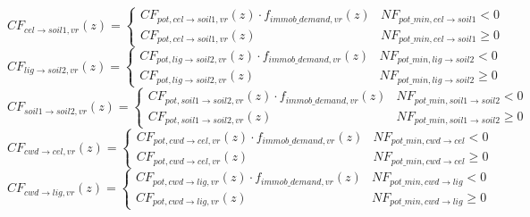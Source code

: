 \begin{equation}
CF_{cel \rightarrow { soil1,vr }}(z)=\left\{\begin{array}{ll}CF_{pot, cel \rightarrow { soil1,vr }}(z) \cdot f_{immob\_{demand, vr}}(z) & NF_{pot\_{min, cel \rightarrow {soil1}}}<0 \\ 
CF_{pot, cel \rightarrow { soil1,vr }}(z) & NF_{pot\_{min,cel } \rightarrow { soil1 }} \geqslant 0
\end{array}\right.
\end{equation}
\begin{equation}
CF_{{lig } \rightarrow { soil2,vr }}(z)=\left\{\begin{array}{ll}C F_{pot, lig \rightarrow { soil2,vr }}(z) \cdot f_{immob\_{demand, vr}}(z) & NF_{pot\_{min, lig \rightarrow { soil2 }}} <0 \\ 
CF_{pot, lig \rightarrow { soil2,vr }}(z) &  NF_{pot\_{min, lig \rightarrow { soil2}}} \geqslant 0
  \end{array}\right.
\end{equation}
\begin{equation}
    C F_{{soil1 } \rightarrow { soil2,vr }}(z)=\left\{\begin{array}{ll}C F_{pot, soil1 \rightarrow { soil2,vr }}(z) \cdot f_{immob\_demand, vr}(z) & NF_{pot\_{min, soil1 \rightarrow soil2 }}<0 \\ 
    CF_{pot, soil1 \rightarrow { soil2,vr }}(z) & NF_{pot\_{min, soil1 \rightarrow { soil2}}} \geqslant 0
  \end{array}\right.
\end{equation}
\begin{equation}
CF_{cwd \rightarrow cel, vr}(z)=\left\{\begin{array}{ll} CF_{pot, cwd \rightarrow cel, vr}(z) \cdot f_{immob\_demand, vr}(z) & NF_{pot\_{min, cwd \rightarrow cel}} <0 \\ 
CF_{pot, cwd \rightarrow cel, vr}(z) & NF_{pot\_{min, cwd \rightarrow cel}} \geqslant 0
  \end{array}\right.
\end{equation}
\begin{equation}
CF_{cwd \rightarrow lig, vr}(z)=\left\{\begin{array}{ll} CF_{pot, cwd \rightarrow lig, vr}(z) \cdot f_{immob\_demand, vr}(z) & NF_{pot\_{min, cwd \rightarrow lig}} <0 \\ 
CF_{pot, cwd \rightarrow lig, vr}(z) & NF_{pot\_{min, cwd \rightarrow lig}} \geqslant 0
  \end{array}\right.
\end{equation}

